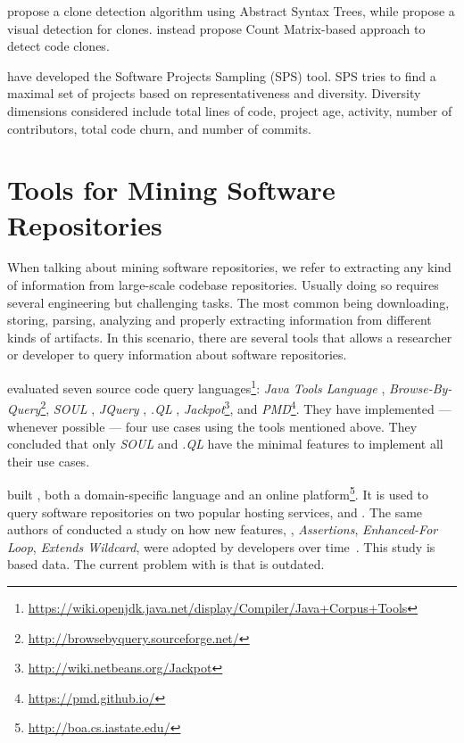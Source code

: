 \cite{baxterCloneDetectionUsing1998} propose a clone detection algorithm using Abstract Syntax Trees,
while \cite{riegerVisualDetectionDuplicated} propose a visual detection for clones.
\cite{yuanCMCDCountMatrix2011,chenReplicationReproductionCode} instead propose Count Matrix-based approach to detect code clones.

\cite{nagappanDiversitySoftwareEngineering2013} have developed the Software Projects Sampling (SPS) tool.
SPS tries to find a maximal set of projects based on representativeness and diversity.
Diversity dimensions considered include total lines of code,
project age, activity, number of contributors, total code churn,
and number of commits.

\section{Tools for Mining Software Repositories}
\label{sec:lr:mining}

When talking about mining software repositories,
we refer to extracting any kind of information from large-scale codebase repositories. 
Usually doing so requires several engineering but challenging tasks.
The most common being downloading, storing, parsing, analyzing and
properly extracting information from different kinds of artifacts.
In this scenario, there are several tools that allows a researcher or developer to query information about software repositories.

\cite{urmaProgrammingLanguageEvolution2012} evaluated seven source code
query languages\footnote{\url{https://wiki.openjdk.java.net/display/Compiler/Java+Corpus+Tools}}:
\emph{Java Tools Language} \citep{cohenJTLJavaTools},
\emph{Browse-By-Query}\footnote{\url{http://browsebyquery.sourceforge.net/}},
\emph{SOUL} \citep{derooverSOULToolSuite2011},
\emph{JQuery} \citep{volderJqueryGenericCode2006},
\emph{.QL} \citep{moorKeynoteAddressQL2007},
\emph{Jackpot}\footnote{\url{http://wiki.netbeans.org/Jackpot}}, and
\emph{PMD}\footnote{\url{https://pmd.github.io/}}.
They have implemented --- whenever possible --- four use cases using the tools mentioned above.
They concluded that only \emph{SOUL} and \emph{.QL} have the minimal features to implement all their use cases.

\cite{dyerBoaLanguageInfrastructure2013,dyerDeclarativeVisitorsEase2013} built \boa{}, both a domain-specific language and an online platform\footnote{\url{http://boa.cs.iastate.edu/}}. 
It is used to query software repositories on two popular hosting services, \github{} and \sourceforge{}.
The same authors of \boa{} conducted a study on
how new \java{} features, \eg,
\emph{Assertions},
\emph{Enhanced-For Loop},
\emph{Extends Wildcard},
were adopted by developers over time~\citep{dyerMiningBillionsAST2014}.
This study is based \sourceforge{} data.
The current problem with \sourceforge{} is that is outdated.

